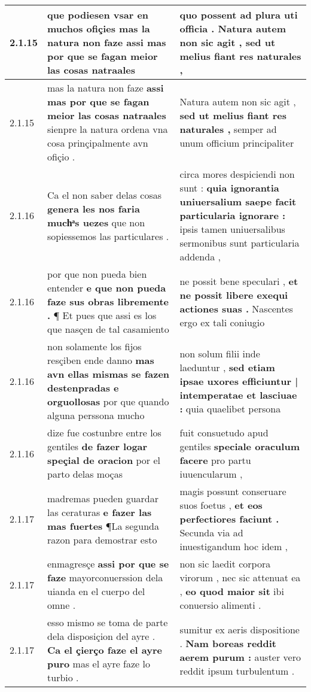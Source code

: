 \begin{tabular}{|p{1cm}|p{6.5cm}|p{6.5cm}|}
2.1.15 & que podiesen vsar en muchos ofiçies \textbf{ mas la natura non faze } assi mas por que se fagan meior las cosas natraales & quo possent ad plura uti officia . \textbf{ Natura autem non sic agit , } sed ut melius fiant res naturales , \\\hline
2.1.15 & mas la natura non faze \textbf{ assi mas por que se fagan meior las cosas natraales } sienpre la natura ordena vna cosa prinçipalmente avn ofiçio . & Natura autem non sic agit , \textbf{ sed ut melius fiant res naturales , } semper ad unum officium principaliter \\\hline
2.1.16 & Ca el non saber delas cosas \textbf{ genera les nos faria muchͣs uezes } que non sopiessemos las particulares . & circa mores despiciendi non sunt : \textbf{ quia ignorantia uniuersalium saepe facit particularia ignorare : } ipsis tamen uniuersalibus sermonibus sunt particularia addenda , \\\hline
2.1.16 & por que non pueda bien entender \textbf{ e que non pueda faze sus obras libremente . } ¶ Et pues que assi es los que nasçen de tal casamiento & ne possit bene speculari , \textbf{ et ne possit libere exequi actiones suas . } Nascentes ergo ex tali coniugio \\\hline
2.1.16 & non solamente los fijos resçiben ende danno \textbf{ mas avn ellas mismas se fazen destenpradas e orguollosas } por que quando alguna perssona mucho & non solum filii inde laeduntur , \textbf{ sed etiam ipsae uxores efficiuntur | intemperatae et lasciuae : } quia quaelibet persona \\\hline
2.1.16 & dize fue costunbre entre los gentiles \textbf{ de fazer logar speçial de oracion } por el parto delas moças & fuit consuetudo apud gentiles \textbf{ speciale oraculum facere } pro partu iuuencularum , \\\hline
2.1.17 & madremas pueden guardar las ceraturas \textbf{ e fazer las mas fuertes } ¶La segunda razon para demostrar esto & magis possunt conseruare suos foetus , \textbf{ et eos perfectiores faciunt . } Secunda via ad inuestigandum hoc idem , \\\hline
2.1.17 & enmagresçe \textbf{ assi por que se faze } mayorconuerssion dela uianda en el cuerpo del omne . & non sic laedit corpora virorum , nec sic attenuat ea , \textbf{ eo quod maior sit } ibi conuersio alimenti . \\\hline
2.1.17 & esso mismo se toma de parte dela disposiçion del ayre . \textbf{ Ca el çierço faze el ayre puro } mas el ayre faze lo turbio . & sumitur ex aeris dispositione . \textbf{ Nam boreas reddit aerem purum : } auster vero reddit ipsum turbulentum . \\\hline

\end{tabular}
